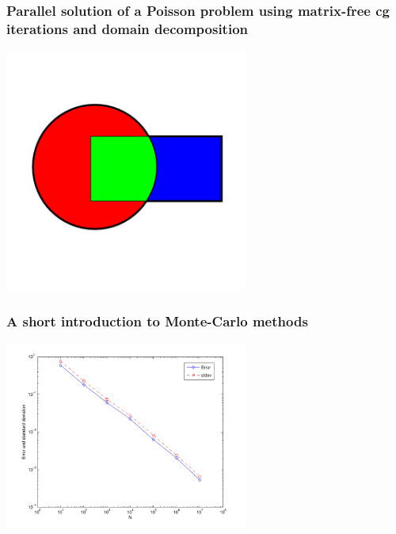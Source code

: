 \documentclass{beamer}
\begin{document}
\begin{frame}\frametitle{Parallel solution of a Poisson problem using
                         matrix-free cg iterations and domain decomposition}
  \begin{center}
    \includegraphics[width=8cm]{dd}
  \end{center}
\end{frame}

\begin{frame}\frametitle{A short introduction to Monte-Carlo methods}
  \begin{center}
    \includegraphics[width=8cm]{Convergence_error_stdev}
  \end{center}
\end{frame}
\end{document}
